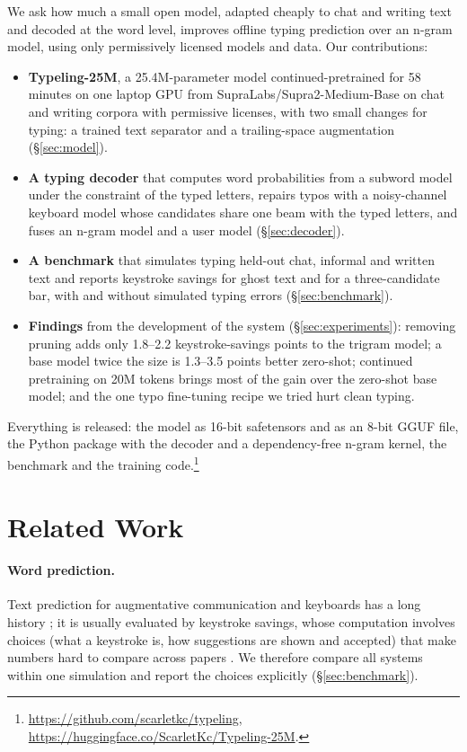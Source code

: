 \documentclass[11pt]{article}
\begin{document}
We ask how much a small open model, adapted cheaply to chat and writing text and decoded at the word level, improves
offline typing prediction over an n-gram model, using only permissively licensed models and data. Our contributions:

\begin{itemize}
  \item \textbf{Typeling-25M}, a 25.4M-parameter model continued-pretrained for 58 minutes on one laptop GPU from
  SupraLabs/Supra2-Medium-Base \citep{supra2-medium-2026} on chat and writing corpora with permissive licenses, with
  two small changes for typing: a trained text separator and a trailing-space augmentation (\S\ref{sec:model}).
  \item \textbf{A typing decoder} that computes word probabilities from a subword model under the constraint of the
  typed letters, repairs typos with a noisy-channel keyboard model whose candidates share one beam with the typed
  letters, and fuses an n-gram model and a user model (\S\ref{sec:decoder}).
  \item \textbf{A benchmark} that simulates typing held-out chat, informal and written text and reports keystroke
  savings for ghost text and for a three-candidate bar, with and without simulated typing errors
  (\S\ref{sec:benchmark}).
  \item \textbf{Findings} from the development of the system (\S\ref{sec:experiments}): removing pruning adds only
  1.8--2.2 keystroke-savings points to the trigram model; a base model twice the size is 1.3--3.5 points better
  zero-shot; continued pretraining on 20M tokens brings most of the gain over the zero-shot base model; and the one
  typo fine-tuning recipe we tried hurt clean typing.
\end{itemize}

Everything is released: the model as 16-bit safetensors and as an 8-bit GGUF file, the Python package with the
decoder and a dependency-free n-gram kernel, the benchmark and the training
code.\footnote{\url{https://github.com/scarletkc/typeling}, \url{https://huggingface.co/ScarletKc/Typeling-25M}.}

\section{Related Work}

\paragraph{Word prediction.} Text prediction for augmentative communication and keyboards has a long history
\citep{garay-vitoria-abascal-2006-text}; it is usually evaluated by keystroke savings, whose computation involves
choices (what a keystroke is, how suggestions are shown and accepted) that make numbers hard to compare across
papers \citep{trnka-mccoy-2008-evaluating}. We therefore compare all systems within one simulation and report the
choices explicitly (\S\ref{sec:benchmark}).
\end{document}
